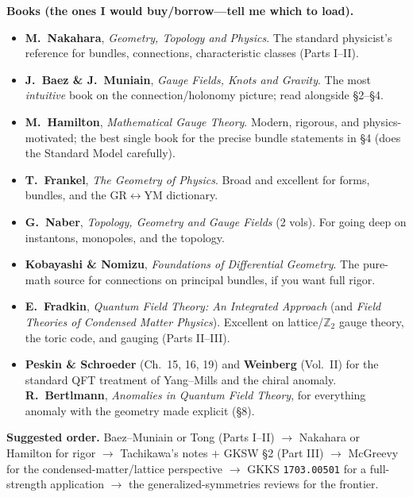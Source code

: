 \documentclass[11pt]{article}
\newcommand{\Ztwo}{\mathbb{Z}_2}
\begin{document}
\medskip
\noindent\textbf{Books (the ones I would buy/borrow---tell me which to load).}
\begin{itemize}\setlength{\itemsep}{2pt}
\item \textbf{M.\ Nakahara}, \emph{Geometry, Topology and Physics}. The standard
physicist's reference for bundles, connections, characteristic classes (Parts I--II).
\item \textbf{J.\ Baez \& J.\ Muniain}, \emph{Gauge Fields, Knots and Gravity}. The most
\emph{intuitive} book on the connection/holonomy picture; read alongside \S2--\S4.
\item \textbf{M.\ Hamilton}, \emph{Mathematical Gauge Theory}. Modern, rigorous, and
physics-motivated; the best single book for the precise bundle statements in \S4 (does
the Standard Model carefully).
\item \textbf{T.\ Frankel}, \emph{The Geometry of Physics}. Broad and excellent for
forms, bundles, and the GR$\leftrightarrow$YM dictionary.
\item \textbf{G.\ Naber}, \emph{Topology, Geometry and Gauge Fields} (2 vols). For going
deep on instantons, monopoles, and the topology.
\item \textbf{Kobayashi \& Nomizu}, \emph{Foundations of Differential Geometry}. The
pure-math source for connections on principal bundles, if you want full rigor.
\item \textbf{E.\ Fradkin}, \emph{Quantum Field Theory: An Integrated Approach} (and
\emph{Field Theories of Condensed Matter Physics}). Excellent on lattice/$\Ztwo$ gauge
theory, the toric code, and gauging (Parts II--III).
\item \textbf{Peskin \& Schroeder} (Ch.\ 15, 16, 19) and \textbf{Weinberg} (Vol.\ II)
for the standard QFT treatment of Yang--Mills and the chiral anomaly. \textbf{R.\
Bertlmann}, \emph{Anomalies in Quantum Field Theory}, for everything anomaly with the
geometry made explicit (\S8).
\end{itemize}

\medskip
\noindent\textbf{Suggested order.} Baez--Muniain or Tong (Parts I--II) $\to$ Nakahara or
Hamilton for rigor $\to$ Tachikawa's notes $+$ GKSW \S2 (Part III) $\to$ McGreevy for the
condensed-matter/lattice perspective $\to$ GKKS \texttt{1703.00501} for a full-strength
application $\to$ the generalized-symmetries reviews for the frontier.
\end{document}
